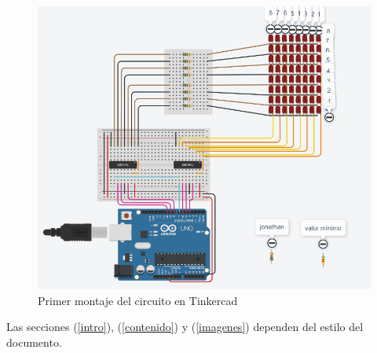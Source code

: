 \documentclass{article}
\begin{document}
\begin{figure}[h]
\includegraphics[width=16cm]{montaje1.png}
\centering
\caption{Primer montaje del circuito en Tinkercad}
\label{fig:montaje1}
\end{figure}


Las secciones (\ref{intro}), (\ref{contenido}) y (\ref{imagenes}) dependen del estilo del documento.



\end{document}
